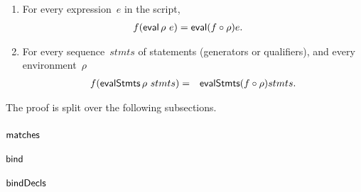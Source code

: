 \begin{prop}
\begin{enumerate}
%





\item For every expression~$e$ in the script,
\begin{eqnarray*}
f(\mathop{\sf eval} \rho ~ e) & = \mathop{\sf eval} (f \circ \rho) e .
\end{eqnarray*}

\item\label{item:evalStmts}
For every sequence~$stmts$ of statements (generators or qualifiers), and every
environment~$\rho$\,  
\begin{eqnarray*}
f (\mathop{\sf evalStmts} \rho ~ stmts) & = & \mathop{\sf evalStmts} (f\circ\rho)stmts.
\end{eqnarray*}

\end{enumerate}
\end{prop}


The proof is split over the following subsections.


\subsubsection{$\mathop{\sf matches}$}

\subsubsection{$\mathop{\sf bind}\nolimits$}

\subsubsection{$\mathop{\sf bindDecls}$}
